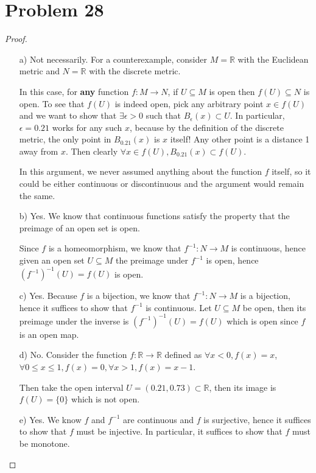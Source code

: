 \documentclass[11pt]{article}
\newcommand{\bbR}{\mathbb{R}}
\renewcommand{\_}[1]{\underline{ #1 }}
\theoremstyle{definition}
\numberwithin{equation}{subsection}
\begin{document}
\section*{Problem 28}
\begin{proof}
\begin{enumerate}
    \item[a)] Not necessarily. For a counterexample, consider $M= \bbR$ with the Euclidean metric and $N= \bbR$ with the discrete metric.

    In this case, for \textbf{any} function $f: M \to N$, if $U\subseteq M$ is open then $f(U) \subseteq N$ is open. To see that $f(U)$ is indeed open, pick any arbitrary point $x\in f(U)$ and we want to show that $\exists \epsilon>0$ such that $B_\epsilon(x) \subset U$. In particular, $\epsilon = 0.21$ works for any such $x$, because by the definition of the discrete metric, the only point in $B_{0.21}(x)$ is $x$ itself! Any other point is a distance 1 away from $x$. Then clearly $\forall x\in f(U), B_{0.21}(x) \subset f(U)$. 

    In this argument, we never assumed anything about the function $f$ itself, so it could be either continuous or discontinuous and the argument would remain the same. 
    

    \item[b)] Yes. We know that continuous functions satisfy the property that the preimage of an open set is open. 

    Since $f$ is a homeomorphism, we know that $f^{-1}: N \to M$ is continuous, hence given an open set $U \subseteq M$ the preimage under $f^{-1}$ is open, hence $(f^{-1})^{-1}(U)=f(U)$ is open.

    \item[c)] Yes. Because $f$ is a bijection, we know that $f^{-1}:N \to M$ is a bijection, hence it suffices to show that $f^{-1}$ is continuous. Let $U \subseteq M$ be open, then its preimage under the inverse is $(f^{-1})^{-1}(U)=f(U)$ which is open since $f$ is an open map.

    \item[d)] No. Consider the function $f: \bbR \to \bbR $ defined as $\forall x<0, f(x)=x$, $\forall 0\leq x\leq 1, f(x)=0, \forall x>1, f(x)=x-1$. 

    Then take the open interval $U=(0.21, 0.73) \subset \bbR$, then its image is $f(U)=\{0\}$ which is not open.  

    \item[e)] Yes. We know $f$ and $f^{-1}$ are continuous and $f$ is surjective, hence it suffices to show that $f$ must be injective. In particular, it suffices to show that $f$ must be monotone.


\end{enumerate}
\end{proof}
\end{document}
